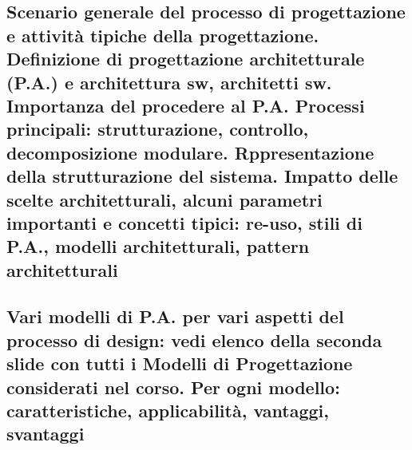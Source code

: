\subsection{Scenario generale del processo di progettazione e attività tipiche della progettazione. Definizione di progettazione architetturale (P.A.) e architettura sw, architetti sw. Importanza del procedere al P.A. Processi principali: strutturazione, controllo, decomposizione modulare.  Rppresentazione della strutturazione del sistema. Impatto delle scelte architetturali, alcuni parametri importanti e concetti tipici: re-uso, stili di P.A., modelli architetturali, pattern architetturali}
\subsection{Vari modelli di P.A. per vari aspetti del processo di design: vedi elenco della seconda slide con tutti i Modelli di Progettazione considerati nel corso. Per ogni modello: caratteristiche, applicabilità, vantaggi, svantaggi}